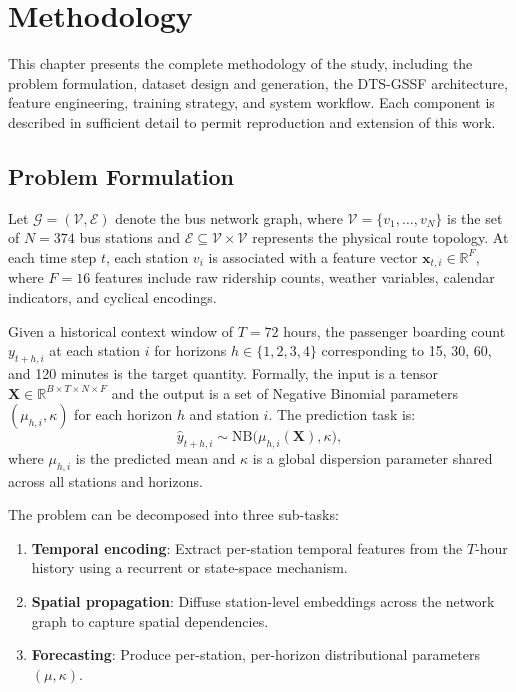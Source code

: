 %
%
\chapter{Methodology}
\label{chap:method}
\setlength{\parskip}{1em}

This chapter presents the complete methodology of the study, including the problem formulation, dataset design and generation, the DTS-GSSF architecture, feature engineering, training strategy, and system workflow. Each component is described in sufficient detail to permit reproduction and extension of this work.

\section{Problem Formulation}
\label{sec:problem}

Let $\mathcal{G} = (\mathcal{V}, \mathcal{E})$ denote the bus network graph, where $\mathcal{V} = \{v_1, \dots, v_N\}$ is the set of $N = 374$ bus stations and $\mathcal{E} \subseteq \mathcal{V} \times \mathcal{V}$ represents the physical route topology. At each time step $t$, each station $v_i$ is associated with a feature vector $\mathbf{x}_{t,i} \in \mathbb{R}^F$, where $F = 16$ features include raw ridership counts, weather variables, calendar indicators, and cyclical encodings.

Given a historical context window of $T = 72$ hours, the passenger boarding count $y_{t+h,i}$ at each station $i$ for horizons $h \in \{1, 2, 3, 4\}$ corresponding to 15, 30, 60, and 120 minutes is the target quantity. Formally, the input is a tensor $\mathbf{X} \in \mathbb{R}^{B \times T \times N \times F}$ and the output is a set of Negative Binomial parameters $(\mu_{h,i}, \kappa)$ for each horizon $h$ and station $i$. The prediction task is:
\begin{equation}
    \hat{y}_{t+h,i} \sim \text{NB}\bigl(\mu_{h,i}(\mathbf{X}), \kappa\bigr),
    \label{eq:prediction}
\end{equation}
where $\mu_{h,i}$ is the predicted mean and $\kappa$ is a global dispersion parameter shared across all stations and horizons.

The problem can be decomposed into three sub-tasks:
\begin{enumerate}
    \item \textbf{Temporal encoding}: Extract per-station temporal features from the $T$-hour history using a recurrent or state-space mechanism.
    \item \textbf{Spatial propagation}: Diffuse station-level embeddings across the network graph to capture spatial dependencies.
    \item \textbf{Forecasting}: Produce per-station, per-horizon distributional parameters $(\mu, \kappa)$.
\end{enumerate}

